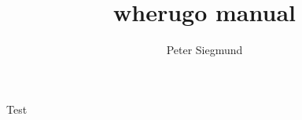 \documentclass[11pt,a4paper,twoside]{refart}
\author{Peter Siegmund}
\title{wherugo manual}
\begin{document}
Test
\end{document}
